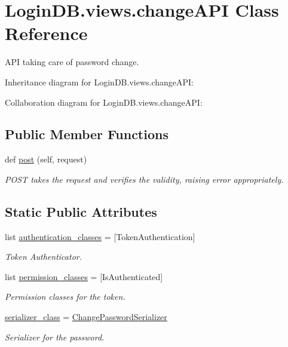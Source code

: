 \hypertarget{class_login_d_b_1_1views_1_1change_a_p_i}{}\section{Login\+D\+B.\+views.\+change\+A\+PI Class Reference}
\label{class_login_d_b_1_1views_1_1change_a_p_i}


A\+PI taking care of password change.  




Inheritance diagram for Login\+D\+B.\+views.\+change\+A\+PI\+:


Collaboration diagram for Login\+D\+B.\+views.\+change\+A\+PI\+:
\subsection*{Public Member Functions}
\begin{DoxyCompactItemize}
\item 
def \hyperlink{class_login_d_b_1_1views_1_1change_a_p_i_af2fb1243472271e274beffb7a4309358}{post} (self, request)
\begin{DoxyCompactList}\small\item\em P\+O\+ST takes the request and verifies the validity, raising error appropriately. \end{DoxyCompactList}\end{DoxyCompactItemize}
\subsection*{Static Public Attributes}
\begin{DoxyCompactItemize}
\item 
list \hyperlink{class_login_d_b_1_1views_1_1change_a_p_i_aa05c99b11b6324e43b9864b9fc9ec5fc}{authentication\+\_\+classes} = \mbox{[}Token\+Authentication\mbox{]}
\begin{DoxyCompactList}\small\item\em Token Authenticator. \end{DoxyCompactList}\item 
list \hyperlink{class_login_d_b_1_1views_1_1change_a_p_i_abf9d3bacee7d5cf40fc1e020cf80f6bc}{permission\+\_\+classes} = \mbox{[}Is\+Authenticated\mbox{]}
\begin{DoxyCompactList}\small\item\em Permission classes for the token. \end{DoxyCompactList}\item 
\hyperlink{class_login_d_b_1_1views_1_1change_a_p_i_a3141d145ac66952145f71ea12f9bced7}{serializer\+\_\+class} = \hyperlink{class_login_d_b_1_1serializers_1_1_change_password_serializer}{Change\+Password\+Serializer}
\begin{DoxyCompactList}\small\item\em Serializer for the password. \end{DoxyCompactList}\end{DoxyCompactItemize}


